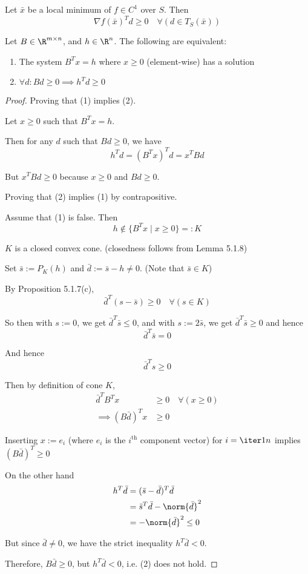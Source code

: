 \label{c8e5836}

Let $\bar x$ be a local minimum of $f\in C^1$ over $S$. Then
$$
	\nabla f(\bar x)^Td\geq0\quad\forall(d\in T_S(\bar x))
$$

\label{d64b0db}

Let $B\in\R^{m\times n}$, and $h\in\R^n$. The following are equivalent:
\begin{enumerate}
	\item The system $B^Tx=h$ where $x\geq0$ (element-wise) has a solution
	\item $\forall d: Bd\geq0\implies h^Td\geq0$
\end{enumerate}

\begin{proof}
	Proving that (1) implies (2).

	Let $x\geq0$ such that $B^Tx=h$.

	Then for any $d$ such that $Bd\geq0$, we have
	$$
		h^Td = (B^Tx)^Td = x^TBd
	$$

	But $x^TBd\geq0$ because $x\geq0$ and $Bd\geq0$.

	Proving that (2) implies (1) by contrapositive.

	Assume that (1) is false. Then
	$$
		h\notin\{B^Tx \mid x\geq0\}=:K
	$$

	$K$ is a closed convex cone. (closedness follows from Lemma 5.1.8)

	Set $\bar s:=P_K(h)$ and $\bar d:=\bar s-h\neq0$. (Note that $\bar
		s\in K$)

	By Proposition 5.1.7(c),
	$$
		\bar d^T(s-\bar s)\geq0\quad\forall(s\in K)
	$$

	So then with $s:=0$, we get $\bar d^T\bar s\leq0$, and with
	$s:=2\bar s$, we get $\bar d^T\bar s\geq0$ and hence
	$$
		\bar d^T\bar s=0
	$$

	And hence
	$$
		\bar d^Ts\geq0
	$$

	Then by definition of cone $K$,
	\begin{align*}
		\bar d^T B^Tx         & \geq0\quad\forall(x\geq0) \\
		\implies (B\bar d)^Tx & \geq 0
	\end{align*}


	Inserting $x:=e_i$ (where $e_i$ is the $i^\text{th}$ component
	vector) for $i=\iter1n$ implies $(B\bar d)^T\geq0$

	On the other hand
	\begin{align*}
		h^T\bar d & = (\bar s-\bar d)^T\bar d        \\
		          & = \bar s^T\bar d-\norm{\bar d}^2 \\
		          & = -\norm{\bar d}^2 \leq 0
	\end{align*}

	But since $\bar d\neq0$, we have the strict inequality $h^T\bar d<0$.

	Therefore, $B\bar d\geq0$, but $h^T\bar d<0$, i.e. (2) does not
	hold.
\end{proof}

